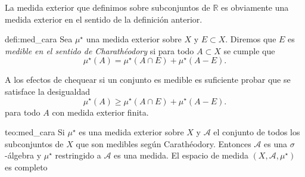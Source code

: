 \begin{ejemplo}{} La medida exterior que definimos sobre subconjuntos de $\mathbb{R}$ es obviamente una medida exterior en el sentido de la definición anterior. 
\end{ejemplo}

 



\begin{definicion}{defi:med_cara}
 Sea $\mu^\star$ una medida exterior sobre $X$ y $E\subset X$. Diremos que $E$ es \emph{medible en el sentido de Charathéodory}  si para todo $A\subset X$ se cumple que
 \begin{equation}\label{eq:cond_cara}
  \mu^\star(A)=\mu^\star(A\cap E)+\mu^\star(A-E).
 \end{equation}

\end{definicion}

 \begin{observacion} A los efectos de chequear si un conjunto es medible es suficiente probar que se satisface la desigualdad 
   \begin{equation}\label{eq:cond_caraII}
  \mu^\star(A)\geq\mu^\star(A\cap E)+\mu^\star(A-E).
 \end{equation}
 para todo $A$ con medida exterior finita.
 \end{observacion}
 
 
 \begin{teorema}{teo:med_cara} Si $\mu^\star$ es una medida exterior sobre $X$ y $\mathscr{A}$ el conjunto de todos los subconjuntos de $X$ que son medibles según Carathéodory. Entonces  $\mathscr{A}$ es una $\sigma$-álgebra y $\mu^\star$ restringido a $\mathscr{A}$ es una medida. El espacio de medida $(X,\mathscr{A},\mu^\star)$ es completo
  
 \end{teorema}
 
